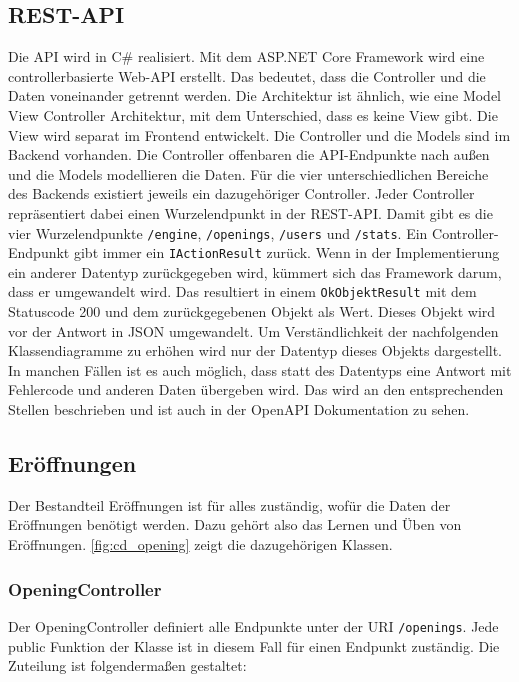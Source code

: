 \subsection{REST-API}
Die API wird in C\# realisiert. Mit dem ASP.NET Core Framework wird eine controllerbasierte Web-API erstellt. Das bedeutet, dass die Controller und die Daten voneinander getrennt werden. Die Architektur ist ähnlich, wie eine Model View Controller Architektur, mit dem Unterschied, dass es keine View gibt. Die View wird separat im Frontend entwickelt. Die Controller und die Models sind im Backend vorhanden. Die Controller offenbaren die API-Endpunkte nach außen und die Models modellieren die Daten. Für die vier unterschiedlichen Bereiche des Backends existiert jeweils ein dazugehöriger Controller. Jeder Controller repräsentiert dabei einen Wurzelendpunkt in der REST-API. Damit gibt es die vier Wurzelendpunkte \lstinline{/engine}, \lstinline{/openings}, \lstinline{/users} und \lstinline{/stats}. Ein Controller-Endpunkt gibt immer ein \lstinline{IActionResult} zurück. Wenn in der Implementierung ein anderer Datentyp zurückgegeben wird, kümmert sich das Framework darum, dass er umgewandelt wird. Das resultiert in einem \lstinline{OkObjektResult} mit dem Statuscode 200 und dem zurückgegebenen Objekt als Wert. Dieses Objekt wird vor der Antwort in JSON umgewandelt. Um Verständlichkeit der nachfolgenden Klassendiagramme zu erhöhen wird nur der Datentyp dieses Objekts dargestellt. In manchen Fällen ist es auch möglich, dass statt des Datentyps eine Antwort mit Fehlercode und anderen Daten übergeben wird. Das wird an den entsprechenden Stellen beschrieben und ist auch in der OpenAPI Dokumentation zu sehen.

\subsection{Eröffnungen}
\label{cp:openings}
Der Bestandteil Eröffnungen ist für alles zuständig, wofür die Daten der Eröffnungen benötigt werden. Dazu gehört also das Lernen und Üben von Eröffnungen. \autoref{fig:cd_opening} zeigt die dazugehörigen Klassen.

\subsubsection{OpeningController}
Der OpeningController definiert alle Endpunkte unter der URI \lstinline{/openings}.
Jede public Funktion der Klasse ist in diesem Fall für einen Endpunkt zuständig. Die Zuteilung ist folgendermaßen gestaltet:

